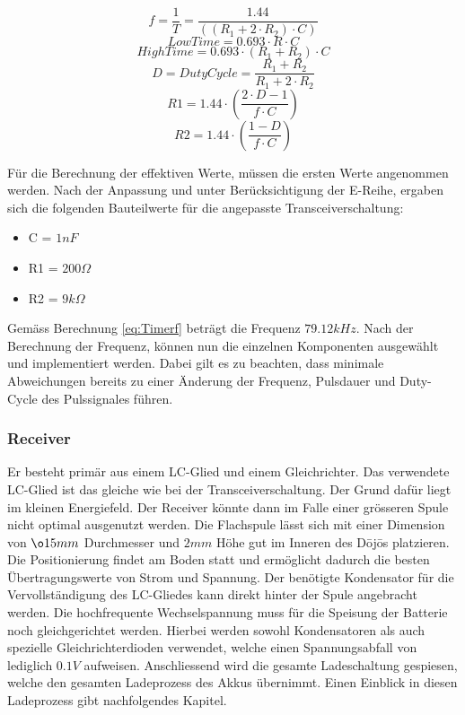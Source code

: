 \begin{equation}\label{eq:Timerf}
f= \dfrac{1}{T}= \dfrac{1.44}{((R_{1} + 2 \cdot R_{2})\cdot C)}
\end{equation}
\begin{equation}\label{eq:TimerTL}
LowTime= 0.693 \cdot R \cdot C
\end{equation}
\begin{equation}\label{eq:TimerTH}
HighTime= 0.693 \cdot (R_{1} + R_{2}) \cdot C
\end{equation}
\begin{equation}\label{eq:TimerDC}
D = DutyCycle = \dfrac{R_{1} + R_{2}}{R_{1} + 2 \cdot R_{2}}
\end{equation}
\begin{equation}\label{eq:TimerR1}
R1 = 1.44 \cdot \left( \dfrac{2 \cdot D - 1}{f \cdot C} \right)
\end{equation}
\begin{equation}\label{eq:TimerR2}
R2 = 1.44 \cdot \left( \dfrac{1-D}{f \cdot C} \right)
\end{equation} 

Für die Berechnung der effektiven Werte, müssen die ersten Werte angenommen werden. Nach der Anpassung und unter Berücksichtigung der E-Reihe, ergaben sich die folgenden Bauteilwerte für die angepasste Transceiverschaltung:

\begin{itemize}
\item C = $1nF$
\item R1 = $200\Omega$
\item R2 = $9k\Omega$
\end{itemize}
 
Gemäss Berechnung \ref{eq:Timerf} beträgt die Frequenz $79.12kHz$. Nach der Berechnung der Frequenz, können nun die einzelnen Komponenten ausgewählt und implementiert werden. Dabei gilt es zu beachten, dass minimale Abweichungen bereits zu einer Änderung der Frequenz, Pulsdauer und Duty-Cycle des Pulssignales führen.

\subsubsection*{Receiver}
Er besteht primär aus einem LC-Glied und einem Gleichrichter. Das verwendete LC-Glied ist das gleiche wie bei der Transceiverschaltung. Der Grund dafür liegt im kleinen Energiefeld. Der Receiver könnte dann im Falle einer grösseren Spule nicht optimal ausgenutzt werden. Die Flachspule lässt sich mit einer Dimension von $\o 15mm$ Durchmesser und $2mm$ Höhe gut im Inneren des Dōjōs platzieren. Die Positionierung findet am Boden statt und ermöglicht dadurch die besten Übertragungswerte von Strom und Spannung. Der benötigte Kondensator für die Vervollständigung des LC-Gliedes kann direkt hinter der Spule angebracht werden. Die hochfrequente Wechselspannung muss für die Speisung der Batterie noch gleichgerichtet werden. Hierbei werden sowohl Kondensatoren als auch spezielle Gleichrichterdioden verwendet, welche einen Spannungsabfall von lediglich $0.1V$ aufweisen. Anschliessend wird die gesamte Ladeschaltung gespiesen, welche den gesamten Ladeprozess des Akkus übernimmt. Einen Einblick in diesen Ladeprozess gibt nachfolgendes Kapitel.
